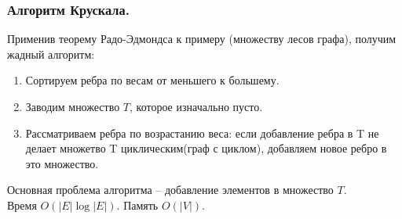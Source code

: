 \documentclass[a4paper,14pt]{article}
\begin{document}
    \subsubsection*{Алгоритм Крускала.}
    \label{subsec:kruskal}
    Применив теорему Радо-Эдмондса к примеру (множеству лесов графа), получим жадный алгоритм:
    \begin{enumerate}
        \item Сортируем ребра по весам от меньшего к большему.
        \item Заводим множество $T$, которое изначально пусто.
        \item Рассматриваем ребра по возрастанию веса: если добавление
        ребра в T не делает множетво T циклическим(граф с циклом),
        добавляем новое ребро в это множество.
    \end{enumerate}
    Основная проблема алгоритма – добавление элементов в множество $T$. \\
    Время $O(|E|\log |E|)$. Память $O(|V|)$.
\end{document}
